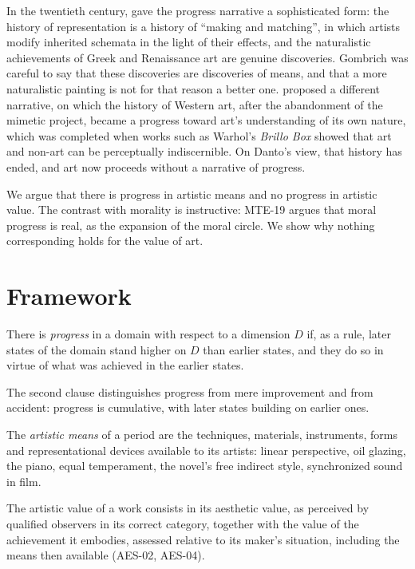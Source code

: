 \documentclass{situationist-preprint}
\begin{document}
In the twentieth century, \citet{Gombrich1960} gave the progress narrative a sophisticated form: the history of representation is a history of \enquote{making and matching}, in which artists modify inherited schemata in the light of their effects, and the naturalistic achievements of Greek and Renaissance art are genuine discoveries. Gombrich was careful to say that these discoveries are discoveries of means, and that a more naturalistic painting is not for that reason a better one. \citet{Danto1984,Danto1997} proposed a different narrative, on which the history of Western art, after the abandonment of the mimetic project, became a progress toward art's understanding of its own nature, which was completed when works such as Warhol's \emph{Brillo Box} showed that art and non-art can be perceptually indiscernible. On Danto's view, that history has ended, and art now proceeds without a narrative of progress.

We argue that there is progress in artistic means and no progress in artistic value. The contrast with morality is instructive: MTE-19 argues that moral progress is real, as the expansion of the moral circle. We show why nothing corresponding holds for the value of art.

\section{Framework}

\begin{definition}[Progress]\label{d:prog}
There is \emph{progress} in a domain with respect to a dimension $D$ if, as a rule, later states of the domain stand higher on $D$ than earlier states, and they do so in virtue of what was achieved in the earlier states.
\end{definition}

The second clause distinguishes progress from mere improvement and from accident: progress is cumulative, with later states building on earlier ones.

\begin{definition}\label{d:means}
The \emph{artistic means} of a period are the techniques, materials, instruments, forms and representational devices available to its artists: linear perspective, oil glazing, the piano, equal temperament, the novel's free indirect style, synchronized sound in film.
\end{definition}

\begin{principle}\label{p:value}
The artistic value of a work consists in its aesthetic value, as perceived by qualified observers in its correct category, together with the value of the achievement it embodies, assessed relative to its maker's situation, including the means then available (AES-02, AES-04).
\end{principle}
\end{document}
